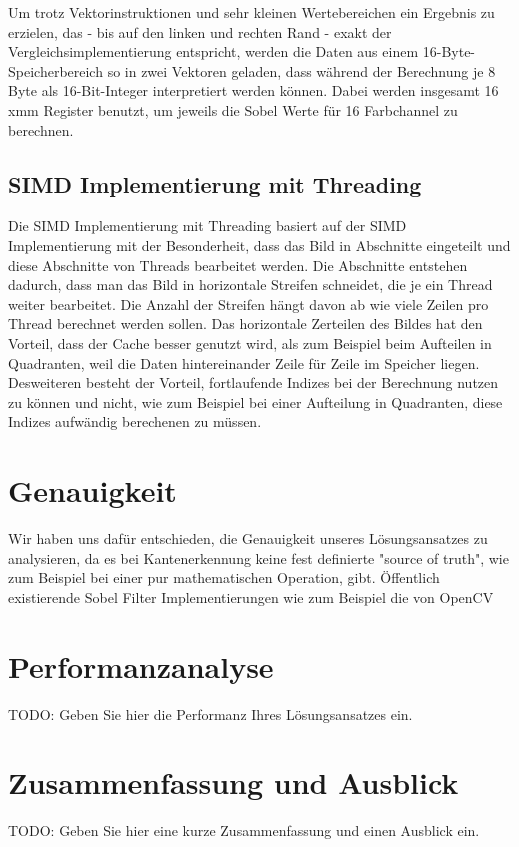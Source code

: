\documentclass[course=erap]{aspdoc}
\begin{document}
Um trotz Vektorinstruktionen und sehr kleinen Wertebereichen ein Ergebnis zu erzielen,
das - bis auf den linken und rechten Rand - exakt der Vergleichsimplementierung entspricht,
werden die Daten aus einem 16-Byte-Speicherbereich so in zwei Vektoren geladen, dass während der Berechnung je 8 Byte
als 16-Bit-Integer interpretiert werden können.
Dabei werden insgesamt 16 xmm Register benutzt, um jeweils die Sobel Werte für 16 Farbchannel zu berechnen.


\subsection{SIMD Implementierung mit Threading}
Die SIMD Implementierung mit Threading basiert auf der SIMD Implementierung mit der Besonderheit, dass das Bild in Abschnitte eingeteilt und diese Abschnitte von Threads bearbeitet werden.
Die Abschnitte entstehen dadurch, dass man das Bild in horizontale Streifen schneidet, die je ein Thread weiter bearbeitet. Die Anzahl der Streifen hängt davon ab wie viele Zeilen pro Thread berechnet werden sollen.
Das horizontale Zerteilen des Bildes hat den Vorteil, dass der Cache besser genutzt wird, als zum Beispiel beim Aufteilen in Quadranten, weil die Daten hintereinander Zeile für Zeile im Speicher liegen.
Desweiteren besteht der Vorteil, fortlaufende Indizes bei der Berechnung nutzen zu können und nicht, wie zum Beispiel bei einer Aufteilung in Quadranten, diese Indizes aufwändig berechenen zu müssen.

\section{Genauigkeit}
Wir haben uns dafür entschieden, die Genauigkeit unseres Lösungsansatzes zu analysieren, da es bei Kantenerkennung keine fest definierte "source of truth", wie zum Beispiel bei einer pur mathematischen Operation, gibt.
Öffentlich existierende Sobel Filter Implementierungen wie zum Beispiel die von OpenCV
\section{Performanzanalyse}

TODO: Geben Sie hier die Performanz Ihres Lösungsansatzes ein.

\section{Zusammenfassung und Ausblick}

TODO: Geben Sie hier eine kurze Zusammenfassung und einen Ausblick ein.


{}
\end{document}
